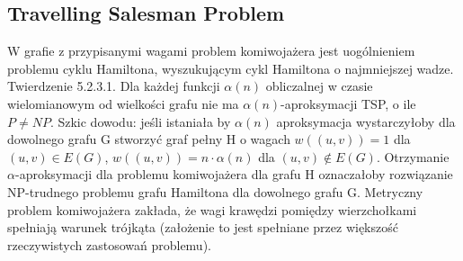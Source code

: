       \subsection{Travelling Salesman Problem}
W grafie z przypisanymi wagami problem komiwojażera jest uogólnieniem problemu cyklu Hamiltona, wyszukującym cykl Hamiltona o najmniejszej wadze.\newline\newline
%
Twierdzenie 5.2.3.1. Dla każdej funkcji $\alpha(n)$ obliczalnej w czasie wielomianowym od wielkości grafu nie ma $\alpha(n)$-aproksymacji TSP, o ile $P\neq NP$.\newline\newline
%
Szkic dowodu: jeśli istaniała by $\alpha(n)$ aproksymacja wystarczyłoby dla dowolnego grafu G stworzyć graf pełny H o wagach
$w((u,v))=1$ dla $(u,v)\in E(G)$, $w((u,v))=n\cdot\alpha(n)$ dla $(u,v)\notin E(G)$. Otrzymanie $\alpha$-aproksymacji dla problemu komiwojażera dla grafu H oznaczałoby rozwiązanie
NP-trudnego problemu grafu Hamiltona dla dowolnego grafu G.\newline\newline
%
Metryczny problem komiwojażera zakłada, że wagi krawędzi pomiędzy wierzchołkami spełniają warunek trójkąta
(założenie to jest spełniane przez większość rzeczywistych zastosowań problemu).\newline


